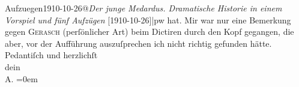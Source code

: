 \begin{ledgroupsized}[t]{13cm}
{{                  Aufzuegen1910-10-26@\strich\emph{Der junge Medardus. Dramatische Historie in einem Vorspiel und fünf Aufzügen} {[}1910-10-26{]}|pw}} hat. Mir war nur eine Bemerkung gegen \textsc{Gerasch} (perſönlicher Art) beim Dictiren durch den Kopf gegangen, die aber, vor der
               Aufführung auszuſprechen ich nicht richtig gefunden hätte.\pend
           \pstart
           Pedantiſch und herzlichſt{\\[\baselineskip]}dein{\\[\baselineskip]}\spacefill\mbox{A}.\pend
           \leftskip=0em{}
         
         \endnumbering{}\end{ledgroupsized}  \newcommand{\dateiname}{L01982}\newcommand{\titel}{Arthur Schnitzler an Hermann Bahr, 19. 11. 1910}\newcommand{\editorInnen}{ Kurt Ifkovits,  Martin Anton Müller}
      